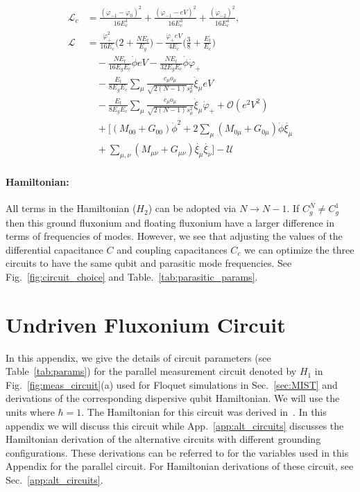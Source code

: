 \documentclass[%
reprint,
superscriptaddress,
 amsmath,amssymb,
 aps,
 prx,
longbibliography,
floatfix,
]{revtex4-2}
\begin{document}
\begin{align}
    \mathcal{L}_{c}&=\frac{(\dot{\varphi}_{-1}-\dot{\varphi}_{0})^2}{16E^1_{c}}+\frac{(\dot{\varphi}_{-1}-eV)^2}{16E^3_{c}}+\frac{(\dot{\varphi}_{-2})^2}{16E^4_{c}},\\
 \mathcal{L}&=\frac{\dot{\varphi}_{+}^2}{16E_c}\Big(2+\frac{NE_t}{E_g}\Big)-\frac{\dot{\varphi}_{+}eV}{4E_c}\Big(\frac{3}{8}+\frac{E_t}{E_c}\Big)\nonumber\\
    &\quad-\frac{NE_t}{16E_gE_c}\dot{\phi}eV-\frac{NE_t}{32E_gE_c}\dot{\phi}\dot{\varphi}_{+}\\
    &\quad -\frac{E_t}{8E_gE_c} \sum_\mu\frac{c_\mu o_\mu}{\sqrt{2(N-1)}s_\mu^2}  \dot{\xi}_\mu eV\nonumber\\
    &\quad-\frac{E_t}{8E_gE_c} \sum_\mu\frac{c_\mu o_\mu}{\sqrt{2(N-1)}s_\mu^2}  \dot{\xi}_\mu\dot{\varphi}_{+}+\mathcal{O}(e^2V^2)\\
    &\quad+\Big[(M_{00}+G_{00})\dot{\phi}^2+2\sum_{\mu}(M_{0\mu}+G_{0\mu})\dot{\phi}\dot{\xi_\mu}\nonumber\\
    &\quad+\sum_{\mu,\nu}(M_{\mu\nu}+G_{\mu\nu})\dot{\xi_\mu}\dot{\xi_\nu}\Big]-\mathcal{U}
\end{align}

\paragraph{Hamiltonian:} All terms in the Hamiltonian ($H_2$) can be adopted via $N\rightarrow N-1$. If $C_g^N\neq C_g^1$ then this ground fluxonium and floating fluxonium have a larger difference in terms of frequencies of modes. However, we see that adjusting the values of the differential capacitance $C$ and coupling capacitances $C_c$ we can optimize the three circuits to have the same qubit and parasitic mode frequencies. See Fig.~\ref{fig:circuit_choice} and Table.~\ref{tab:parasitic_params}.


\section{Undriven Fluxonium Circuit}\label{app:Hamiltonian}
In this appendix, we give the details of circuit parameters (see Table~\ref{tab:params}) for the parallel measurement circuit denoted by $H_1$ in Fig.~\ref{fig:meas_circuit}(a) used for Floquet simulations in Sec.~\ref{sec:MIST} and derivations of the corresponding dispersive qubit Hamiltonian. We will use the units where $\hbar=1$. The Hamiltonian for this circuit was derived in~\cite{viola2015collective}. In this appendix we will discuss this circuit while App.~\ref{app:alt_circuits} discusses the Hamiltonian derivation of the alternative circuits with different grounding configurations. These derivations can be referred to for the variables used in this Appendix for the parallel circuit. For Hamiltonian derivations of these circuit, see Sec.~\ref{app:alt_circuits}. 
\end{document}
